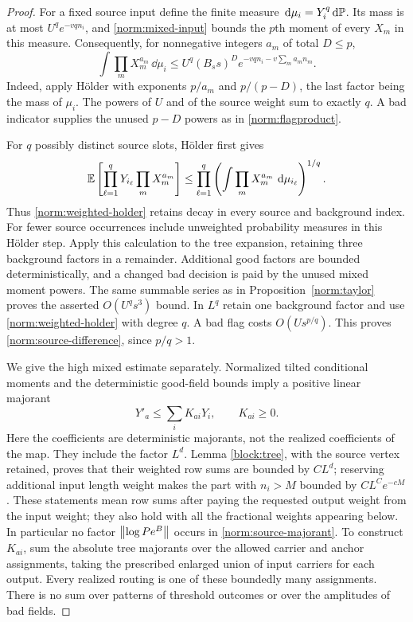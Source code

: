 \begin{proof}
For a fixed source input define the finite measure
$\,\mathrm d\mu_i=Y_i^q\,\mathrm d\mathbb P$.  Its mass is at most
$U^qe^{-vq n_i}$, and \eqref{norm:mixed-input} bounds the $p$th moment
of every $X_m$ in this measure.  Consequently, for nonnegative integers
$a_m$ of total $D\le p$,
\begin{equation}\label{norm:weighted-holder}
 \int\prod_m X_m^{a_m}\,\dd\mu_i
 \le U^q(B_s s)^D
       e^{-vq n_i-v\sum_m a_mn_m}.
\end{equation}
Indeed, apply H\"older with exponents $p/a_m$ and $p/(p-D)$, the last
factor being the mass of $\mu_i$.  The powers of $U$ and of the source
weight sum to exactly $q$.  A bad indicator supplies the unused
$p-D$ powers as in \eqref{norm:flagproduct}.

For $q$ possibly distinct source slots, H\"older first gives
\[
 \mathbb E\left[\prod_{\ell=1}^qY_{i_\ell}\prod_mX_m^{a_m}\right]
 \le\prod_{\ell=1}^q
       \left(\int\prod_mX_m^{a_m}\,\,\mathrm d\mu_{i_\ell}\right)^{1/q}.
\]
Thus \eqref{norm:weighted-holder} retains decay in every source and
background index.  For fewer source occurrences include unweighted
probability measures in this H\"older step.  Apply this calculation to
the tree expansion, retaining three background factors in a remainder.
Additional good factors are bounded deterministically, and a changed
bad decision is paid by the unused mixed moment powers.  The same
summable series as in Proposition~\ref{norm:taylor} proves the asserted
$O(U^qs^3)$ bound.  In $L^q$ retain one background factor and use
\eqref{norm:weighted-holder} with degree $q$.  A bad flag costs
$O(Us^{p/q})$.  This proves \eqref{norm:source-difference}, since
$p/q>1$.

We give the high mixed estimate separately.  Normalized tilted
conditional moments and the deterministic good-field bounds imply a
positive linear majorant
\begin{equation}\label{norm:source-majorant}
             Y'_a\le\sum_i K_{ai}Y_i,\qquad K_{ai}\ge0.
\end{equation}
Here the coefficients are deterministic majorants, not the realized
coefficients of the map.  They include the factor $L^d$.  Lemma
\ref{block:tree}, with the source vertex retained, proves that their
weighted row sums are bounded by $C L^d$; reserving additional input
length weight makes the part with $n_i>M$ bounded by
$CL^Ce^{-cM}$.  These statements mean row sums after paying the
requested output weight from the input weight; they also hold with
all the fractional weights appearing below.  In particular no factor
$\left\lVert\log P e^B\right\rVert$ occurs in \eqref{norm:source-majorant}.
To construct $K_{ai}$, sum the absolute tree majorants over the allowed
carrier and anchor assignments, taking the prescribed enlarged union
of input carriers for each output.  Every realized routing is one of
these boundedly many assignments.  There is no sum over patterns of
threshold outcomes or over the amplitudes of bad fields.


\end{proof}
